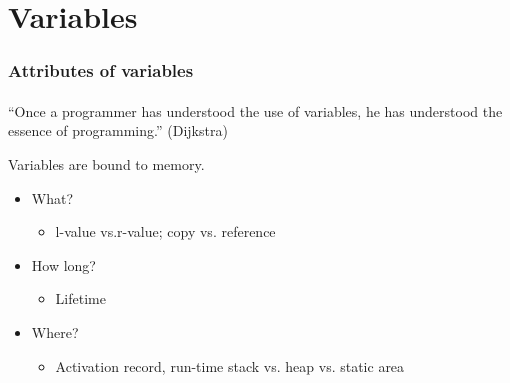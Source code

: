 \documentclass{beamer}
\begin{document}
\section{Variables}
\begin{frame}[fragile]
\frametitle{Attributes of variables }
\framesubtitle{}
``Once a programmer has understood the use of variables, he has
understood the essence of programming.'' (Dijkstra)
\bigskip

Variables are bound to memory.

\begin{itemize}
\item What?
\begin{itemize}
\item l-value vs.r-value; copy vs. reference
\end{itemize}
\item How long?

\begin{itemize}
\item Lifetime 
\end{itemize}
\item Where? 
\begin{itemize}
\item Activation record, run-time stack vs. heap vs. static area
\end{itemize}
\end{itemize}
\end{frame}
\end{document}
